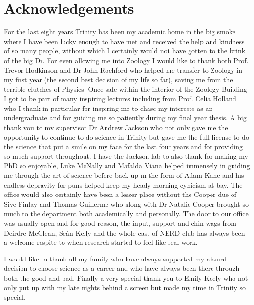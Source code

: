 \chapter*{Acknowledgements}


For the last eight years Trinity has been my academic home in the big smoke where I have been lucky enough to have met and received the help and kindness of so many people, without which I certainly would not have gotten to the brink of the big Dr. For even allowing me into Zoology I would like to thank both Prof. Trevor Hodkinson and Dr John Rochford who helped me transfer to Zoology in my first year (the second best decision of my life so far), saving me from the terrible clutches of Physics. Once safe within the interior of the Zoology Building I got to be part of many inspiring lectures including from Prof. Celia Holland who I thank in particular for inspiring me to chase my interests as an undergraduate and for guiding me so patiently during my final year thesis. A big thank you to my supervisor Dr Andrew Jackson who not only gave me the opportunity to continue to do science in Trinity but gave me the full license to do the science that put a smile on my face for the last four years and for providing so much support throughout. I have the Jackson lab to also thank for making my PhD so enjoyable, Luke McNally and Mafalda Viana helped immensely in guiding me through the art of science before back-up in the form of Adam Kane and his endless depravity for puns helped keep my heady morning cynicism at bay. The office would also certainly have been a lesser place without the Cooper due of Sive Finlay and Thomas Guillerme who along with Dr Natalie Cooper brought so much to the department both academically and personally. The door to our office was usually open and for good reason, the input, support and chin-wags from Deirdre McClean, Se{\'a}n Kelly and the whole cast of NERD club has always been a welcome respite to when research started to feel like real work.  

I would like to thank all my family who have always supported my absurd decision to choose science as a career and who have always been there through both the good and bad. Finally a very special thank you to Emily Keely who not only put up with my late nights behind a screen but made my time in Trinity so special.


